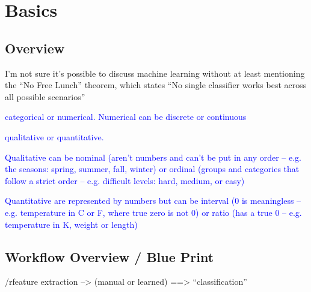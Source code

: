 \chapter{Basics}

\section{Overview}

I'm not sure it's possible to discuss machine learning without at least mentioning the ``No Free Lunch'' theorem, which states ``No single classifier works best across all possible scenarios''

\textcolor{blue}{categorical or numerical. Numerical can be discrete or continuous}

\textcolor{blue}{qualitative or quantitative.} 

\textcolor{blue}{Qualitative can be nominal (aren't numbers and can't be put in any order -- e.g. the seasons: spring, summer, fall, winter) or ordinal (groups and categories that follow a strict order -- e.g. difficult levels: hard, medium, or easy)}

\textcolor{blue}{Quantitative are represented by numbers but can be interval (0 is meaningless -- e.g. temperature in C or F, where true zero is not 0) or ratio (has a true 0 -- e.g. temperature in K, weight or length)}

\section{Workflow Overview / Blue Print}

/r{feature extraction --> (manual or learned) ==> ``classification''}


